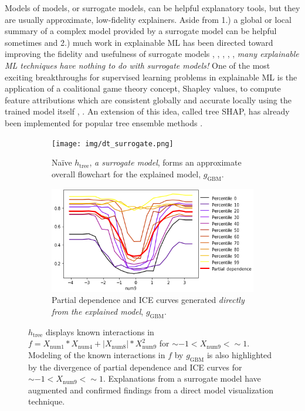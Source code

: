 \documentclass{article}
\begin{document}
Models of models, or surrogate models, can be helpful explanatory tools, but they are usually approximate, low-fidelity explainers. Aside from 1.) a global or local summary of a complex model provided by a surrogate model can be helpful sometimes and 2.) much work in explainable ML has been directed toward improving the fidelity and usefulness of surrogate models \cite{dt_surrogate2}, \cite{viper}, \cite{dt_surrogate1}, \cite{lime-sup}, \cite{wf_xnn}, \textit{many explainable ML techniques have nothing to do with surrogate models!} One of the most exciting breakthroughs for supervised learning problems in explainable ML is the application of a coalitional game theory concept, Shapley values, to compute feature attributions which are consistent globally and accurate locally using the trained model itself \cite{shapley}, \cite{kononenko2010efficient}. An extension of this idea, called tree SHAP, has already been implemented for popular tree ensemble methods \cite{tree_shap}. 

\begin{figure}[htb!]
	\begin{subfigure}{.55\textwidth}
		\texttt{[image: img/dt\_surrogate.png]}
  		\caption{Na\"ive $h_{\text{tree}}$, \textit{a surrogate model}, forms an approximate overall flowchart for the explained model, $g_{\text{GBM}}$.}
  		\label{fig:dt_surrogate}
	\end{subfigure}\hspace{5pt}
	\begin{subfigure}{.45\textwidth}
  		\includegraphics[height=.52\linewidth, width=1.02\linewidth]{img/pdp_ice.png}
  		\caption{Partial dependence and ICE curves generated \textit{directly from the explained model}, $g_{\text{GBM}}$.}
  		\label{fig:pdp_ice}
	\end{subfigure}
	\caption{$h_{\text{tree}}$ displays known interactions in $f = X_{\text{num}1} * X_{\text{num}4} + |X_{\text{num}8}| * X_{\text{num}9}^2$ for $\sim -1 < X_{\text{num9}} <  \sim 1$. Modeling of the known interactions in $f$ by $g_{\text{GBM}}$ is also highlighted by the divergence of partial dependence and ICE curves for $\sim -1 < X_{\text{num9}} <  \sim 1$. Explanations from a surrogate model have augmented and confirmed findings from a direct model visualization technique.}
	\label{fig:pdp_ice_dt_surrogate}
\end{figure}
\end{document}
